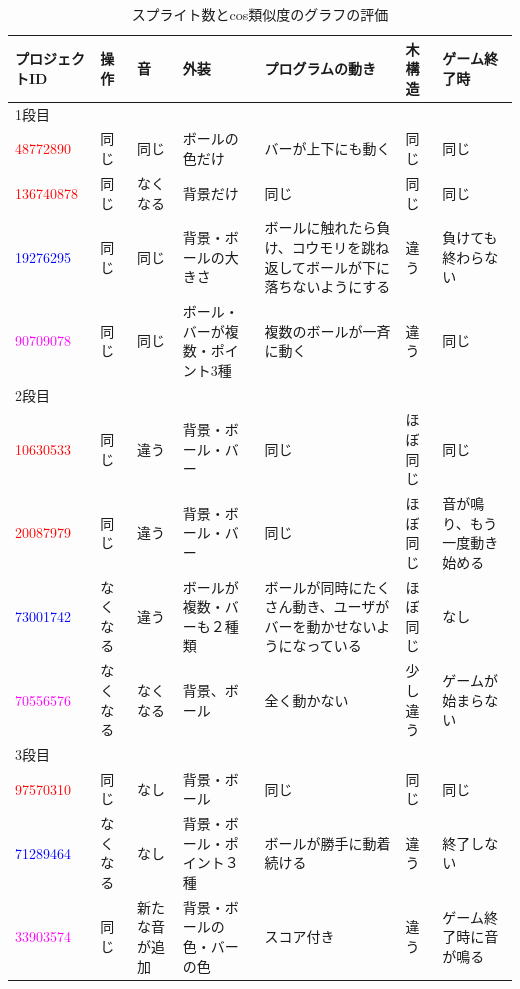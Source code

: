\documentclass[a4paper,10pt,onecolumn,oneside,openany]{jsbook}
\begin{document}
\begin{table}[h]
 \scriptsize
 \caption{スプライト数とcos類似度のグラフの評価}
 \label{splite}
 \begin{center}
\begin{tabular}{|p{1.7cm}||p{1cm}|p{1cm}|p{1.7cm}|p{2cm}|p{1cm}|p{1.7cm}|} \hline

プロジェクトID & 操作 & 音 & 外装 & プログラムの動き & 木構造 & ゲーム終了時 \\ \hline \hline
1段目 &  &  &  &  &  &  \\ \hline
\textcolor{red}{48772890} & 同じ & 同じ & ボールの色だけ & バーが上下にも動く & 同じ & 同じ \\ \hline
\textcolor{red}{136740878} & 同じ & なくなる & 背景だけ & 同じ & 同じ & 同じ \\ \hline
\textcolor{blue}{19276295} & 同じ & 同じ & 背景・ボールの大きさ & ボールに触れたら負け、コウモリを跳ね返してボールが下に落ちないようにする & 違う & 負けても終わらない \\ \hline
\textcolor{magenta}{90709078} & 同じ & 同じ & ボール・バーが複数・ポイント3種 & 複数のボールが一斉に動く & 違う & 同じ \\ \hline

2段目 &  &  &  &  &  &  \\ \hline
\textcolor{red}{10630533} & 同じ & 違う & 背景・ボール・バー & 同じ & ほぼ同じ & 同じ \\ \hline
\textcolor{red}{20087979} & 同じ & 違う & 背景・ボール・バー & 同じ & ほぼ同じ & 音が鳴り、もう一度動き始める \\ \hline
\textcolor{blue}{73001742} & なくなる & 違う & ボールが複数・バーも２種類 & ボールが同時にたくさん動き、ユーザがバーを動かせないようになっている & ほぼ同じ & なし \\ \hline
\textcolor{magenta}{70556576} & なくなる & なくなる & 背景、ボール & 全く動かない & 少し違う & ゲームが始まらない \\ \hline

3段目 &  &  &  &  &  &  \\ \hline
\textcolor{red}{97570310} & 同じ & なし & 背景・ボール & 同じ & 同じ & 同じ \\ \hline
\textcolor{blue}{71289464} & なくなる & なし & 背景・ボール・ポイント３種 & ボールが勝手に動着続ける & 違う & 終了しない \\
\textcolor{magenta}{33903574} & 同じ & 新たな音が追加 & 背景・ボールの色・バーの色 & スコア付き & 違う & ゲーム終了時に音が鳴る \\ \hline


\end{tabular}
\end{center}
\end{table}
\end{document}
